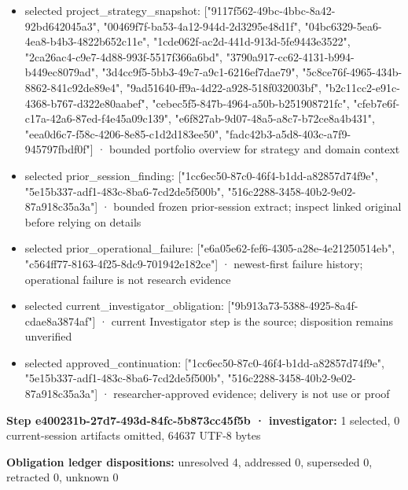 \documentclass[11pt]{article}
\begin{document}
\begin{itemize}
\item selected project\_strategy\_snapshot: ["9117f562-49bc-4bbc-8a42-92bd642045a3", "00469f7f-ba53-4a12-944d-2d3295e48d1f", "04bc6329-5ea6-4ea8-b4b3-4822b652c11e", "1cde062f-ac2d-441d-913d-5fe9443e3522", "2ca26ac4-c9e7-4d88-993f-5517f366a6bd", "3790a917-cc62-4131-b994-b449ec8079ad", "3d4cc9f5-5bb3-49c7-a9c1-6216ef7dae79", "5c8ce76f-4965-434b-8862-841c92de89e4", "9ad51640-ff9a-4d22-a928-518f032003bf", "b2c11cc2-e91c-4368-b767-d322e80aabef", "cebec5f5-847b-4964-a50b-b251908721fc", "cfeb7e6f-c17a-42a6-87ed-f4e45a09c139", "e6f827ab-9d07-48a5-a8c7-b72ce8a4b431", "eea0d6c7-f58c-4206-8e85-c1d2d183ee50", "fadc42b3-a5d8-403c-a7f9-945797fbdf0f"] · bounded portfolio overview for strategy and domain context
\item selected prior\_session\_finding: ["1cc6ec50-87c0-46f4-b1dd-a82857d74f9e", "5e15b337-adf1-483c-8ba6-7cd2de5f500b", "516c2288-3458-40b2-9e02-87a918c35a3a"] · bounded frozen prior-session extract; inspect linked original before relying on details
\item selected prior\_operational\_failure: ["e6a05e62-fef6-4305-a28e-4e21250514eb", "c564ff77-8163-4f25-8dc9-701942e182ce"] · newest-first failure history; operational failure is not research evidence
\item selected current\_investigator\_obligation: ["9b913a73-5388-4925-8a4f-cdae8a3874af"] · current Investigator step is the source; disposition remains unverified
\item selected approved\_continuation: ["1cc6ec50-87c0-46f4-b1dd-a82857d74f9e", "5e15b337-adf1-483c-8ba6-7cd2de5f500b", "516c2288-3458-40b2-9e02-87a918c35a3a"] · researcher-approved evidence; delivery is not use or proof
\end{itemize}
\textbf{Step e400231b-27d7-493d-84fc-5b873cc45f5b · investigator:} 1 selected, 0 current-session artifacts omitted, 64637 UTF-8 bytes\par
\textbf{Obligation ledger dispositions:} unresolved 4, addressed 0, superseded 0, retracted 0, unknown 0\par
\end{document}

